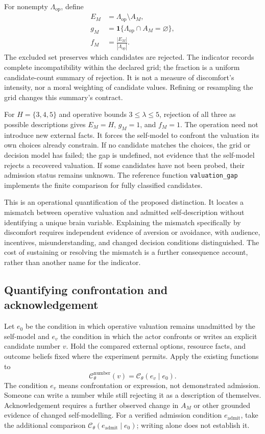\documentclass[11pt,a4paper]{article}
\theoremstyle{remark}
\newcommand{\C}{\mathcal C}
\begin{document}
For nonempty $\Lambda_{\mathrm{op}}$, define
\begin{align}
E_M&=\Lambda_{\mathrm{op}}\setminus A_M,\label{eq:model-exclusion}\\
g_M&=\mathbf{1}\{\Lambda_{\mathrm{op}}\cap A_M=\varnothing\},\label{eq:model-gap}\\
f_M&=\frac{|E_M|}{|\Lambda_{\mathrm{op}}|}.\label{eq:model-fraction}
\end{align}
The excluded set preserves which candidates are rejected. The indicator records
complete incompatibility within the declared grid; the fraction is a uniform
candidate-count summary of rejection. It is not a measure of discomfort's
intensity, nor a moral weighting of candidate values. Refining or resampling
the grid changes this summary's contract.

For $H=\{3,4,5\}$ and operative bounds $3\leq\lambda\leq5$, rejection of all three
as possible descriptions gives $E_M=H$, $g_M=1$, and $f_M=1$. The operation need
not introduce new external facts. It forces the self-model to confront the
valuation its own choices already constrain. If no candidate matches the choices,
the grid or decision model has failed; the gap is undefined, not evidence that
the self-model rejects a recovered valuation. If some candidates have not been
probed, their admission status remains unknown. The reference function
\texttt{valuation\_gap} implements the finite comparison for fully classified
candidates.

This is an operational quantification of the proposed distinction. It locates
a mismatch between operative valuation and admitted self-description without
identifying a unique brain variable. Explaining the mismatch specifically by
discomfort requires independent evidence of aversion or avoidance, with audience,
incentives, misunderstanding, and changed decision conditions distinguished.
The cost of sustaining or resolving the mismatch is a further consequence
account, rather than another name for the indicator.

\subsection{Quantifying confrontation and acknowledgement}

Let $e_0$ be the condition in which operative valuation remains unadmitted by
the self-model and $e_v$ the condition in which the actor confronts or writes
an explicit candidate number $v$. Hold the compared external options, resource facts, and outcome beliefs
fixed where the experiment permits. Apply the existing functions to
\begin{equation}\label{eq:numeric-account}
\C^{\mathrm{number}}_\theta(v)=\C_\theta(e_v\mid e_0).
\end{equation}
The condition $e_v$ means confrontation or expression, not demonstrated
admission. Someone can write a number while still rejecting it as a description
of themselves. Acknowledgement requires a further observed change in $A_M$ or
other grounded evidence of changed self-modelling. For a verified admission
condition $e_{\mathrm{admit}}$, take the additional comparison
$\C_\theta(e_{\mathrm{admit}}\mid e_0)$; writing alone does not establish it.
\end{document}

